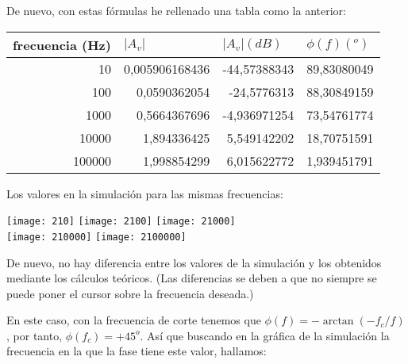 \documentclass{article}
\begin{document}
De nuevo, con estas fórmulas he rellenado una tabla como la anterior:


\begin{table}[h]
\centering
\begin{tabular}{|r|r|r|r|}
\hline
\multicolumn{1}{|l|}{frecuencia (Hz)} & \multicolumn{1}{l|}{$|A_v|$} & \multicolumn{1}{l|}{$|A_v|(dB)$} & \multicolumn{1}{l|}{$\phi (f) (^o)$} \\ \hline
10                                    & 0,005906168436                                    & -44,57388343                     & 89,83080049                          \\ \hline
100                                   & 0,0590362054                                      & -24,5776313                      & 88,30849159                          \\ \hline
1000                                  & 0,5664367696                                      & -4,936971254                     & 73,54761774                          \\ \hline
10000                                 & 1,894336425                                       & 5,549142202                      & 18,70751591                          \\ \hline
100000                                & 1,998854299                                       & 6,015622772                      & 1,939451791                          \\ \hline
\end{tabular}
\end{table}


Los valores en la simulación para las mismas frecuencias:

\begin{center}
\texttt{[image: 210]}
\texttt{[image: 2100]}
\texttt{[image: 21000]}\\
\texttt{[image: 210000]}
\texttt{[image: 2100000]}
\end{center}

De nuevo, no hay diferencia entre los valores de la simulación y los obtenidos mediante los cálculos teóricos. (Las diferencias se deben a que no siempre se puede poner el cursor sobre la frecuencia deseada.)

En este caso, con la frecuencia de corte tenemos que $\phi (f)=-\arctan(-f_c/f)$, por tanto, $\phi (f_c)=+45^o$. Así que buscando en la gráfica de la simulación la frecuencia en la que la fase tiene este valor, hallamos:
\end{document}
